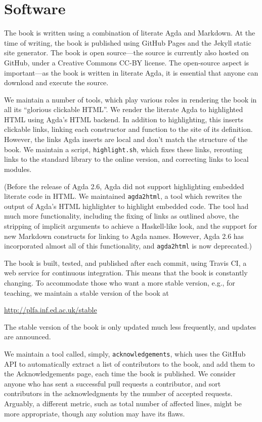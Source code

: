 \documentclass[preprint,authoryear]{elsarticle}
\begin{document}
\section{Software}

The book is written using a combination of literate Agda and Markdown.  At the
time of writing, the book is published using GitHub Pages and the Jekyll static
site generator.  The book is open source---the source is currently also hosted
on GitHub, under a Creative Commons CC-BY license.  The open-source aspect is
important---as the book is written in literate Agda, it is essential that anyone
can download and execute the source.

We maintain a number of tools, which play various roles in rendering the book in
all its ``glorious clickable HTML''. We render the literate Agda to highlighted
HTML using Agda's HTML backend. In addition to highlighting, this inserts
clickable links, linking each constructor and function to the site of its
definition.  However, the links Agda inserts are local and don't match the
structure of the book.  We maintain a script, \texttt{highlight.sh}, which fixes
these links, rerouting links to the standard library to the online version, and
correcting links to local modules.

(Before the release of Agda 2.6, Agda did not support highlighting embedded
literate code in HTML.  We maintained \texttt{agda2html}, a tool which rewrites
the output of Agda's HTML highlighter to highlight embedded code. The tool had
much more functionality, including the fixing of links as outlined above, the
stripping of implicit arguments to achieve a Haskell-like look, and the support
for new Markdown constructs for linking to Agda names. However, Agda 2.6 has
incorporated almost all of this functionality, and \texttt{agda2html} is now
deprecated.)

The book is built, tested, and published after each commit, using Travis CI, a
web service for continuous integration.  This means that the book is constantly
changing.  To accommodate those who want a more stable version, e.g., for
teaching, we maintain a stable version of the book at
\begin{center}
  \url{http://plfa.inf.ed.ac.uk/stable}
\end{center}
The stable version of the book is only updated much less frequently, and updates
are announced.

We maintain a tool called, simply, \texttt{acknowledgements}, which uses
the GitHub API to automatically extract a list of contributors to the book, and
add them to the Acknowledgements page, each time the book is published.  We
consider anyone who has sent a successful pull requests a contributor, and sort
contributors in the acknowledgments by the number of accepted requests.
Arguably, a different metric, such as total number of affected lines, might be
more appropriate, though any solution may have its flaws.
\end{document}
